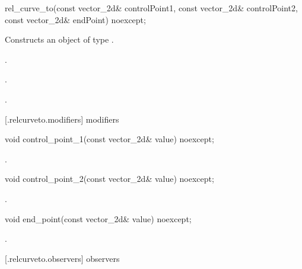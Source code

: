 \begin{itemdecl}
    rel_curve_to(const vector_2d& controlPoint1, const vector_2d& controlPoint2,
      const vector_2d& endPoint) noexcept;
\end{itemdecl}
\begin{itemdescr}
	\pnum
	\effects
	Constructs an object of type .
	
	\pnum
	\postconditions
	.

	.

	.

\end{itemdescr}

 [\iotwod.relcurveto.modifiers]{ modifiers}

\begin{itemdecl}
    void control_point_1(const vector_2d& value) noexcept;
\end{itemdecl}
\begin{itemdescr}
	\pnum
	\postconditions
	.
	
\end{itemdescr}

\begin{itemdecl}
    void control_point_2(const vector_2d& value) noexcept;
\end{itemdecl}
\begin{itemdescr}
	\pnum
	\postconditions
	.
	
\end{itemdescr}

\begin{itemdecl}
    void end_point(const vector_2d& value) noexcept;
\end{itemdecl}
\begin{itemdescr}
	\pnum
	\postconditions
	.
	
\end{itemdescr}

 [\iotwod.relcurveto.observers]{ observers}

